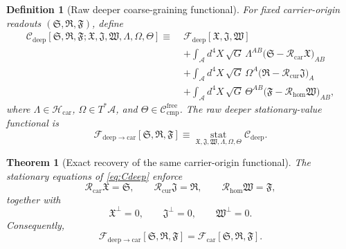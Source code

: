 \documentclass[11pt]{article}
\newcommand{\Sub}{\mathcal A}
\newcommand{\CompFree}{\mathscr C_{\mathrm{cmp}}^{\mathrm{free}}}
\newcommand{\CarrierFunctional}{\mathscr F_{\mathrm{car}}}
\newcommand{\DeepFunctional}{\mathscr F_{\mathrm{deep}}}
\newcommand{\DeepToCar}{\mathscr F_{\mathrm{deep}\to\mathrm{car}}}
\newcommand{\CarrierClass}{\mathscr H_{\mathrm{car}}}
\newcommand{\CarrierSeed}{\mathfrak S}
\newcommand{\RelabelSeed}{\mathfrak R}
\newcommand{\FreeSeed}{\mathfrak F}
\newcommand{\StrainMult}{\Lambda}
\newcommand{\NeutralMult}{\Omega}
\newcommand{\FreeMult}{\Theta}
\newcommand{\DeepTensor}{\mathfrak X}
\newcommand{\DeepRelabel}{\mathfrak J}
\newcommand{\DeepFree}{\mathfrak W}
\newcommand{\CarRead}{\mathcal R_{\mathrm{car}}}
\newcommand{\CurRead}{\mathcal R_{\mathrm{cur}}}
\newcommand{\HomRead}{\mathcal R_{\mathrm{hom}}}
\newtheorem{definition}{Definition}
\newtheorem{theorem}{Theorem}
\begin{document}
\begin{definition}[Raw deeper coarse-graining functional]
\label{def:deep_cg}
For fixed carrier-origin readouts \((\CarrierSeed,\RelabelSeed,\FreeSeed)\), define
\begin{equation}
\begin{aligned}
\mathscr C_{\mathrm{deep}}
[\CarrierSeed,\RelabelSeed,\FreeSeed;\DeepTensor,\DeepRelabel,\DeepFree,\StrainMult,\NeutralMult,\FreeMult]
\equiv\;
&\DeepFunctional[\DeepTensor,\DeepRelabel,\DeepFree]
\\
&+\int_{\Sub} d^4X\,\sqrt{G}\,
\StrainMult^{AB}\bigl(\CarrierSeed-\CarRead\DeepTensor\bigr)_{AB}
\\
&+\int_{\Sub} d^4X\,\sqrt{G}\,
\NeutralMult^A\bigl(\RelabelSeed-\CurRead\DeepRelabel\bigr)_A
\\
&+\int_{\Sub} d^4X\,\sqrt{G}\,
\FreeMult^{AB}\bigl(\FreeSeed-\HomRead\DeepFree\bigr)_{AB},
\end{aligned}
\label{eq:Cdeep}
\end{equation}
where \(\StrainMult\in\CarrierClass\), \(\NeutralMult\in T^*\Sub\), and \(\FreeMult\in\CompFree\). The raw deeper stationary-value functional is
\begin{equation}
\DeepToCar[\CarrierSeed,\RelabelSeed,\FreeSeed]
\equiv
\operatorname*{stat}_{\DeepTensor,\DeepRelabel,\DeepFree,\StrainMult,\NeutralMult,\FreeMult}
\mathscr C_{\mathrm{deep}}.
\label{eq:Fdeepstat}
\end{equation}
\end{definition}

\begin{theorem}[Exact recovery of the same carrier-origin functional]
\label{thm:recover_car}
The stationary equations of \eqref{eq:Cdeep} enforce
\begin{equation}
\CarRead\DeepTensor=\CarrierSeed,
\qquad
\CurRead\DeepRelabel=\RelabelSeed,
\qquad
\HomRead\DeepFree=\FreeSeed,
\label{eq:deep_constraints_1}
\end{equation}
together with
\begin{equation}
\DeepTensor^{\perp}=0,
\qquad
\DeepRelabel^{\perp}=0,
\qquad
\DeepFree^{\perp}=0.
\label{eq:deep_constraints_2}
\end{equation}
Consequently,
\begin{equation}
\DeepToCar[\CarrierSeed,\RelabelSeed,\FreeSeed]
=
\CarrierFunctional[\CarrierSeed,\RelabelSeed,\FreeSeed].
\label{eq:deep_to_carrier}
\end{equation}
\end{theorem}
\end{document}

